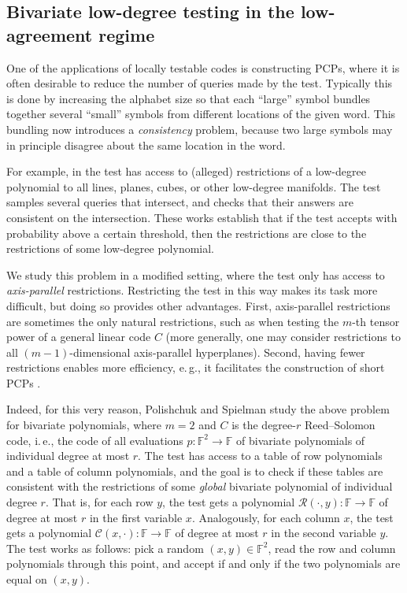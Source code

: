 \documentclass[11pt]{article}
\numberwithin{equation}{section}
\theoremstyle{definition}
\theoremstyle{plain}
\newcommand{\ie}{i.\,e.}
\newcommand{\eg}{e.\,g.}
\theoremstyle{plain}
\newcommand{\colored}{}
\newcommand{\Field}{\colored{\mathbb F}}
\newcommand{\degree}{\colored{r}}
\newcommand{\rowpoly}{\colored{\mathcal R}}
\newcommand{\colpoly}{\colored{\mathcal C}}
\begin{document}
%
%
\subsection{Bivariate low-degree testing in the low-agreement regime}
\label{sec:bivariate-testing}

One of the applications of locally testable codes is constructing PCPs, where it is often desirable to reduce the number of queries made by the test. Typically this is done by increasing the alphabet size so that each ``large'' symbol bundles together several ``small'' symbols from different locations of the given word. This bundling now introduces a \emph{consistency} problem, because two large symbols may in principle disagree about the same location in the word.

For example, in \cite{RazS97,AroraS03,MoshkovitzR08-ldt,BhangaleDN17} the test has access to (alleged) restrictions of a low-degree polynomial to all lines, planes, cubes, or other low-degree manifolds. The test samples several queries that intersect, and checks that their answers are consistent on the intersection. These works establish that if the test accepts with probability above a certain threshold, then the restrictions are close to the restrictions of some low-degree polynomial.

We study this problem in a modified setting, where the test only has access to \emph{axis-parallel} restrictions. Restricting the test in this way makes its task more difficult, but doing so provides other advantages. First, axis-parallel restrictions are sometimes the only natural restrictions, such as when testing the
%
$m$-th tensor power                                                                 %
of a general linear code $C$ (more generally, one may consider restrictions to all $(m-1)$-dimensional axis-parallel hyperplanes). Second, having fewer restrictions enables more efficiency, \eg, it facilitates the construction of short PCPs \cite{PolishchukS94,BenSassonS08}.

Indeed, for this very reason, Polishchuk and Spielman \cite{PolishchukS94} study the above problem for bivariate polynomials, where $m=2$ and $C$ is the degree-$\degree$ Reed--Solomon code, \ie, the code of all evaluations $p \colon \Field^2 \to \Field$ of bivariate polynomials of individual degree at most $\degree$. The test has access to a table of row polynomials and a table of column polynomials, and the goal is to check if these tables are consistent with the restrictions of some \emph{global} bivariate polynomial of individual degree $\degree$. That is, for each row $y$, the test gets a polynomial $\rowpoly(\cdot,y) \colon \Field \to \Field$ of degree at most $\degree$ in the first variable $x$. Analogously, for each column $x$, the test gets a polynomial $\colpoly(x,\cdot) \colon \Field \to \Field$ of degree at most $\degree$ in the second variable $y$. The test works as follows: pick a random $(x,y) \in \Field^2$, read the row and column polynomials through this point, and accept if and only if the two polynomials are equal on $(x,y)$.
\end{document}
